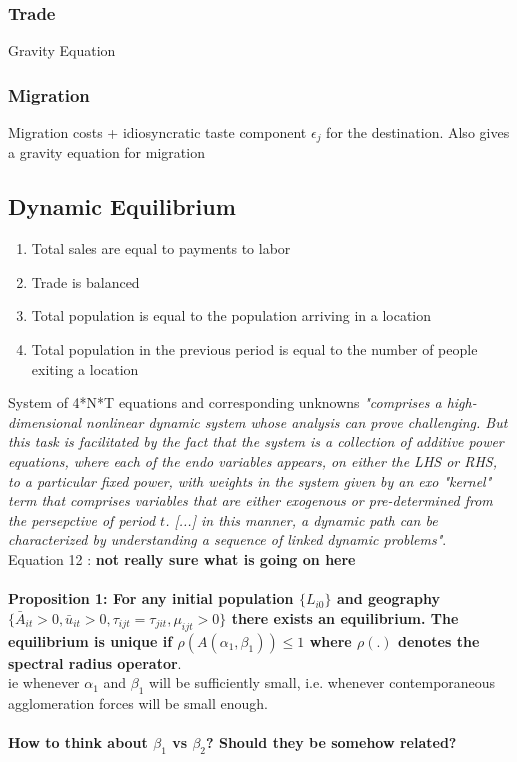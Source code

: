 \documentclass[12pt, final]{article}
\begin{document}
\subsubsection{Trade} %
\label{ssub:trade}
Gravity Equation

\subsubsection{Migration} %
\label{ssub:migration}

Migration costs + idiosyncratic taste component $\epsilon_j$ for the destination. Also gives a gravity equation for migration

\subsection{Dynamic Equilibrium} %
\label{sub:dynamic_equilibrium}

\begin{enumerate}
    \item Total sales are equal to payments to labor
    \item Trade is balanced
    \item Total population is equal to the population arriving in a location
    \item Total population in the previous period is equal to the number of people exiting a location
\end{enumerate}
System of 4*N*T equations and corresponding unknowns \textit{"comprises a high-dimensional nonlinear dynamic system whose analysis can prove challenging. But this task is facilitated by the fact that the system is a collection of additive power equations, where each of the endo variables appears, on either the LHS or RHS, to a particular fixed power, with weights in the system given by an exo "kernel" term that comprises variables that are either exogenous or pre-determined from the persepctive of period $t$. [...] in this manner, a dynamic path can be characterized by understanding a sequence of linked dynamic problems"}.
\\
Equation 12 : \textbf{not really sure what is going on here}
\\
\\
\textbf{Proposition 1: For any initial population $\{L_{i0}\}$ and geography $\{\bar{A}_{it} > 0, \bar{u}_{it} > 0, \tau_{ijt} = \tau_{jit}, \mu_{ijt} > 0\}$ there exists an equilibrium. The equilibrium is unique if $\rho(A(\alpha_1, \beta_1)) \leq 1$ where $\rho(.)$ denotes the spectral radius operator}. \\ 
ie whenever $\alpha_1$ and $\beta_1$ will be sufficiently small, i.e. whenever contemporaneous agglomeration forces will be small enough.
\\
\\
\textbf{How to think about $\beta_1$ vs $\beta_2$? Should they be somehow related?}
\end{document}
